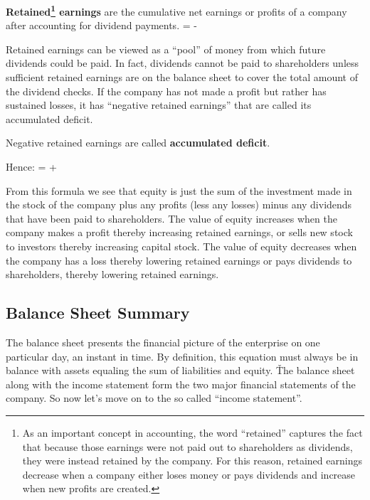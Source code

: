 \textbf{Retained\footnote{As an important concept in accounting, the word ``retained'' captures the fact that because
those earnings were not paid out to shareholders as dividends, they were instead retained by the company. For this
reason, retained earnings decrease when a company either loses money or pays dividends and increase when new profits
are created.} earnings} are the cumulative net earnings or profits of a company after accounting for dividend
payments.
\bse
{} =  - 
\ese
\ed

Retained earnings can be viewed as a ``pool'' of money from which future dividends could be paid. In fact, dividends
cannot be paid to shareholders unless sufficient retained earnings are on the balance sheet to cover the total amount
of the dividend checks. If the company has not made a profit but rather has sustained losses, it has ``negative
retained earnings'' that are called its accumulated deficit.

Negative retained earnings are called \textbf{accumulated deficit}.
\ed

Hence:
\bse
{} =  + 
\ese

From this formula we see that equity is just the sum of the investment made in the stock of the company plus any
profits (less any losses) minus any dividends that have been paid to shareholders. The value of equity increases when
the company makes a profit thereby increasing retained earnings, or sells new stock to investors thereby increasing
capital stock. The value of equity decreases when the company has a loss thereby lowering retained earnings or pays
dividends to shareholders, thereby lowering retained earnings.

\subsection{Balance Sheet Summary}


The balance sheet presents the financial picture of the enterprise on one particular day, an instant in time. By
definition, this equation must always be in balance with assets equaling the sum of liabilities and equity. \v

The balance sheet along with the income statement form the two major financial statements of the company. So now let's
move on to the so called ``income statement''.

